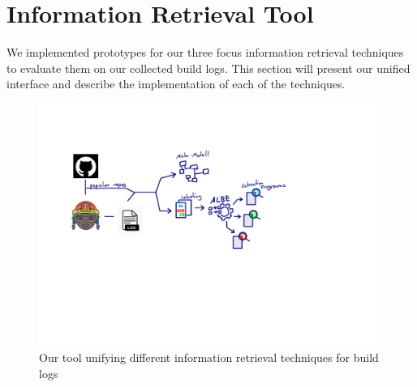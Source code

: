 \documentclass[\myrootdir/main.tex]{subfiles}
\begin{document}
\chapter{Information Retrieval Tool}
\label{sec:implementation}
We implemented prototypes for our three focus information retrieval techniques to evaluate them on our collected build logs.
This section will present our unified interface and describe the implementation of each of the techniques.


\begin{figure}[h]
	\centering
	\includegraphics[page=7, width=\textwidth, trim={0.5cm 0.5cm 0.5cm 0.5cm}, clip]{img/flow-of-research.pdf}
	\caption{Our tool unifying different information retrieval techniques for build logs}
	\label{fig:tool}
\end{figure}
\end{document}
